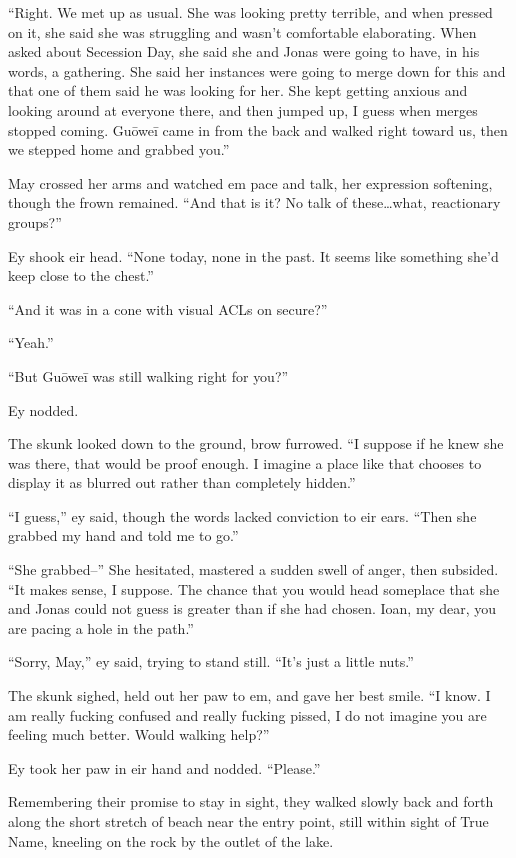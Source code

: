 ``Right. We met up as usual. She was looking pretty terrible, and when pressed on it, she said she was struggling and wasn't comfortable elaborating. When asked about Secession Day, she said she and Jonas were going to have, in his words, a gathering. She said her instances were going to merge down for this and that one of them said he was looking for her. She kept getting anxious and looking around at everyone there, and then jumped up, I guess when merges stopped coming. Guōweī came in from the back and walked right toward us, then we stepped home and grabbed you.''

May crossed her arms and watched em pace and talk, her expression softening, though the frown remained. ``And that is it? No talk of these\ldots what, reactionary groups?''

Ey shook eir head. ``None today, none in the past. It seems like something she'd keep close to the chest.''

``And it was in a cone with visual ACLs on secure?''

``Yeah.''

``But Guōweī was still walking right for you?''

Ey nodded.

The skunk looked down to the ground, brow furrowed. ``I suppose if he knew she was there, that would be proof enough. I imagine a place like that chooses to display it as blurred out rather than completely hidden.''

``I guess,'' ey said, though the words lacked conviction to eir ears. ``Then she grabbed my hand and told me to go.''

``She grabbed--'' She hesitated, mastered a sudden swell of anger, then subsided. ``It makes sense, I suppose. The chance that you would head someplace that she and Jonas could not guess is greater than if she had chosen. Ioan, my dear, you are pacing a hole in the path.''

``Sorry, May,'' ey said, trying to stand still. ``It's just a little nuts.''

The skunk sighed, held out her paw to em, and gave her best smile. ``I know. I am really fucking confused and really fucking pissed, I do not imagine you are feeling much better. Would walking help?''

Ey took her paw in eir hand and nodded. ``Please.''

Remembering their promise to stay in sight, they walked slowly back and forth along the short stretch of beach near the entry point, still within sight of True Name, kneeling on the rock by the outlet of the lake.


